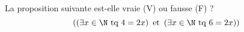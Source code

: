 La proposition suivante est-elle vraie (V) ou fausse (F) ?
\begin{displaymath}
  \left( \left( \exists x \in \N \text{ tq } 4 = 2x \right)\text{ et } \left( \exists x \in \N \text{ tq } 6 = 2x \right)\right) 
\end{displaymath}
\bigskip
